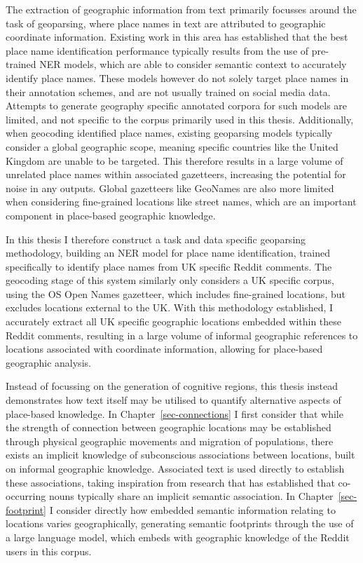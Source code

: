 \documentclass[
  letterpaper,
  11pt,
  english,
  onehalfspacing,
  headsepline]{MastersDoctoralThesis}
\begin{document}
The extraction of geographic information from text primarily focusses
around the task of geoparsing, where place names in text are attributed
to geographic coordinate information. Existing work in this area has
established that the best place name identification performance
typically results from the use of pre-trained NER models, which are able
to consider semantic context to accurately identify place names. These
models however do not solely target place names in their annotation
schemes, and are not usually trained on social media data. Attempts to
generate geography specific annotated corpora for such models are
limited, and not specific to the corpus primarily used in this thesis.
Additionally, when geocoding identified place names, existing geoparsing
models typically consider a global geographic scope, meaning specific
countries like the United Kingdom are unable to be targeted. This
therefore results in a large volume of unrelated place names within
associated gazetteers, increasing the potential for noise in any
outputs. Global gazetteers like GeoNames are also more limited when
considering fine-grained locations like street names, which are an
important component in place-based geographic knowledge.

In this thesis I therefore construct a task and data specific geoparsing
methodology, building an NER model for place name identification,
trained specifically to identify place names from UK specific Reddit
comments. The geocoding stage of this system similarly only considers a
UK specific corpus, using the OS Open Names gazetteer, which includes
fine-grained locations, but excludes locations external to the UK. With
this methodology established, I accurately extract all UK specific
geographic locations embedded within these Reddit comments, resulting in
a large volume of informal geographic references to locations associated
with coordinate information, allowing for place-based geographic
analysis.

Instead of focussing on the generation of cognitive regions, this thesis
instead demonstrates how text itself may be utilised to quantify
alternative aspects of place-based knowledge. In
Chapter~\ref{sec-connections} I first consider that while the strength
of connection between geographic locations may be established through
physical geographic movements and migration of populations, there exists
an implicit knowledge of subconscious associations between locations,
built on informal geographic knowledge. Associated text is used directly
to establish these associations, taking inspiration from research that
has established that co-occurring nouns typically share an implicit
semantic association. In Chapter~\ref{sec-footprint} I consider directly
how embedded semantic information relating to locations varies
geographically, generating semantic footprints through the use of a
large language model, which embeds with geographic knowledge of the
Reddit users in this corpus.
\end{document}
